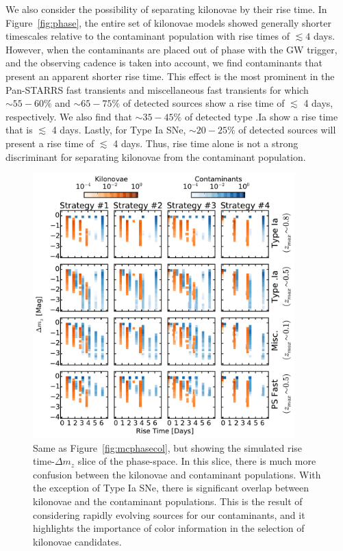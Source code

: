 We also consider the possibility of separating kilonovae by their rise time. In Figure~\ref{fig:phase}, the entire set of kilonovae models showed generally shorter timescales relative to the contaminant population with rise times of $\lesssim4$ days. However, when the contaminants are placed out of phase with the GW trigger, and the observing cadence is taken into account, we find contaminants that present an apparent shorter rise time. This effect is the most prominent in the Pan-STARRS fast transients and miscellaneous fast transients for which $\sim55-60\%$ and $\sim65-75\%$ of detected sources show a rise time of $\lesssim$ 4 days, respectively. We also find that $\sim 35-45\%$ of detected type .Ia show a rise time that is $\lesssim$ 4 days. Lastly, for Type Ia SNe, $\sim20-25\%$ of detected sources will present a rise time of $\lesssim$ 4 days. Thus, rise time alone is not a strong discriminant for separating kilonovae from the contaminant population.
   
\begin{figure}[t!]
\centering
\includegraphics[width=0.9\textwidth]{./figs/chapter2/ch2_f9.pdf}
\caption{Same as Figure~\ref{fig:mcphasecol}, but showing the simulated rise time-$\Delta m_z$ slice of the phase-space. In this slice, there is much more confusion between the kilonovae and contaminant populations. With the exception of Type Ia SNe, there is significant overlap between kilonovae and the contaminant populations. This is the result of considering rapidly evolving sources for our contaminants, and it highlights the importance of color information in the selection of kilonovae candidates.}
\label{fig:mcphasedm}
\end{figure}
   

